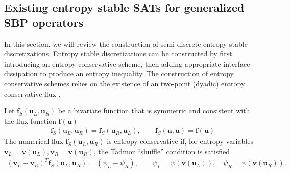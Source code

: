 \documentclass[review,onefignum,onetabnum,final]{siamart171218}
\newcommand{\pd}[2]{\frac{\partial#1}{\partial#2}}
\newcommand{\LRp}[1]{\left( #1 \right)}
\newcommand{\LRl}[1]{\left. #1 \right|}
\newcommand{\diag}[1]{{\rm diag}\LRp{#1}}
\begin{document}
%


\subsection{Existing entropy stable SATs for generalized SBP operators}
\label{sec:gsbpsat}

In this section, we will review the construction of semi-discrete entropy stable discretizations.  Entropy stable discretizations can be constructed by first introducing an entropy conservative scheme, then adding appropriate interface dissipation to produce an entropy inequality.  The construction of entropy conservative schemes relies on the existence of an two-point (dyadic) entropy conservative flux \cite{tadmor1987numerical}.  
\begin{definition}
\label{def:tadmor}
Let $\bm{f}_S(\bm{u}_L,\bm{u}_R)$ be a bivariate function that is symmetric and consistent with the flux function $\bm{f}(\bm{u})$
\begin{align*}
\bm{f}_S(\bm{u}_L,\bm{u}_R) = \bm{f}_S(\bm{u}_R,\bm{u}_L), \qquad \bm{f}_S(\bm{u},\bm{u}) = \bm{f}(\bm{u})
\end{align*}
The numerical flux $\bm{f}_S(\bm{u}_L, \bm{u}_R)$ is entropy conservative if, for entropy variables $\bm{v}_L = \bm{v}(\bm{u}_L), \bm{v}_R = \bm{v}(\bm{u}_R)$, the Tadmor ``shuffle'' condition is satisfied
\begin{align*}
\LRp{\bm{v}_L - \bm{v}_R}^T \bm{f}_S(\bm{u}_L,\bm{u}_R) = (\psi_L - \psi_R), \qquad \psi_L = \psi(\bm{v}(\bm{u}_L)), \quad \psi_R = \psi(\bm{v}(\bm{u}_R)).  
\end{align*}
\end{definition}
\end{document}
